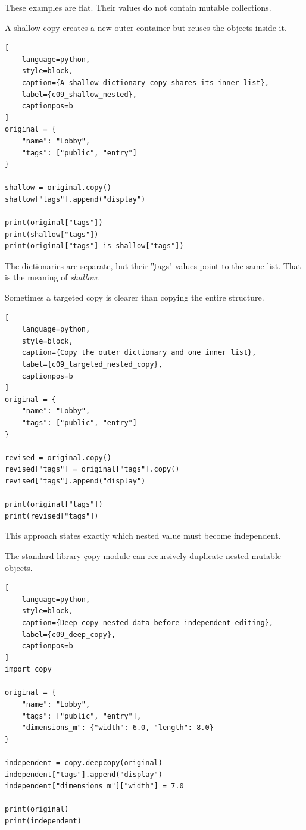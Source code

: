 These examples are flat. Their values do not contain mutable collections.


A shallow copy creates a new outer container but reuses the objects inside it.

\begin{lstlisting}[
    language=python,
    style=block,
    caption={A shallow dictionary copy shares its inner list},
    label={c09_shallow_nested},
    captionpos=b
]
original = {
    "name": "Lobby",
    "tags": ["public", "entry"]
}

shallow = original.copy()
shallow["tags"].append("display")

print(original["tags"])
print(shallow["tags"])
print(original["tags"] is shallow["tags"])
\end{lstlisting}

The dictionaries are separate, but their \c{"tags"} values point to the same
list. That is the meaning of \emph{shallow}.


Sometimes a targeted copy is clearer than copying the entire structure.

\begin{lstlisting}[
    language=python,
    style=block,
    caption={Copy the outer dictionary and one inner list},
    label={c09_targeted_nested_copy},
    captionpos=b
]
original = {
    "name": "Lobby",
    "tags": ["public", "entry"]
}

revised = original.copy()
revised["tags"] = original["tags"].copy()
revised["tags"].append("display")

print(original["tags"])
print(revised["tags"])
\end{lstlisting}

This approach states exactly which nested value must become independent.


The standard-library \c{copy} module can recursively duplicate nested mutable
objects.

\begin{lstlisting}[
    language=python,
    style=block,
    caption={Deep-copy nested data before independent editing},
    label={c09_deep_copy},
    captionpos=b
]
import copy

original = {
    "name": "Lobby",
    "tags": ["public", "entry"],
    "dimensions_m": {"width": 6.0, "length": 8.0}
}

independent = copy.deepcopy(original)
independent["tags"].append("display")
independent["dimensions_m"]["width"] = 7.0

print(original)
print(independent)
\end{lstlisting}

